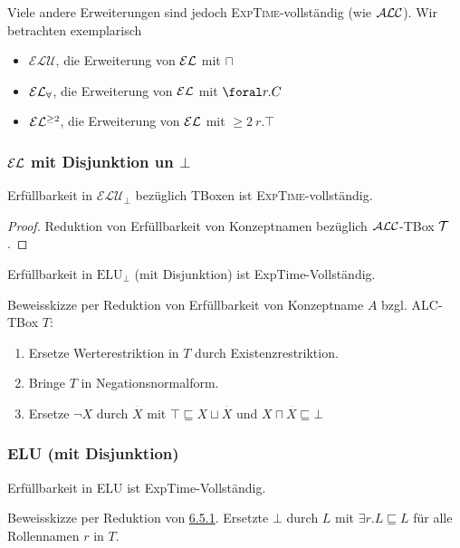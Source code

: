 Viele andere Erweiterungen sind jedoch \textsc{ExpTime}-vollständig (wie $\mathcal{A}\mathcal{L}\mathcal{C}$). Wir betrachten exemplarisch
\begin{itemize}
    \item $\mathcal{ELU}$, die Erweiterung von $\mathcal{E}\mathcal{L}$ mit $\sqcap$
    \item $\mathcal{E}\mathcal{L}_\forall$, die Erweiterung von $\mathcal{E}\mathcal{L}$ mit $\foral r.C$
    \item $\mathcal{E}\mathcal{L}^{\geq 2}$, die Erweiterung von $\mathcal{E}\mathcal{L}$ mit $\geq 2\ r.\top$
\end{itemize}


\subsubsection{\texorpdfstring{$\mathcal{E}\mathcal{L}$ mit Disjunktion un $\bot$}{EL mit Disjunktion und Bottom}}

\begin{theorem}
    Erfüllbarkeit in $\mathcal{ELU}_\bot$ bezüglich TBoxen ist \textsc{ExpTime}-vollständig.
\end{theorem}

\begin{proof}
    Reduktion von Erfüllbarkeit von Konzeptnamen bezüglich $\mathcal{A}\mathcal{L}\mathcal{C}$-TBox $\mathcal{T}$.

\end{proof}

Erfüllbarkeit in $\text{ELU}_{\bot}$ (mit Disjunktion) ist
ExpTime-Vollständig.

Beweisskizze per Reduktion von Erfüllbarkeit von Konzeptname $A$ bzgl.
ALC-TBox $T$:

\begin{enumerate}
\def\labelenumi{\arabic{enumi}.}
\item
  Ersetze Werterestriktion in $T$ durch Existenzrestriktion.
\item
  Bringe $T$ in Negationsnormalform.
\item
  Ersetze $\neg X$ durch $\overset{\overline{}}{X}$ mit
  $\top \sqsubseteq X \sqcup \overset{\overline{}}{X}$ und
  $X \sqcap \overset{\overline{}}{X} \sqsubseteq \bot$
\end{enumerate}

\subsubsection{ELU (mit Disjunktion)}\label{elu-mit-disjunktion}

Erfüllbarkeit in ELU ist ExpTime-Vollständig.

Beweisskizze per Reduktion von
\protect\hyperlink{el-mit-disjunktion-und-bottom}{6.5.1}. Ersetzte
$\bot$ durch $L$ mit $\exists r.L \sqsubseteq L$ für alle
Rollennamen $r$ in $T$.
